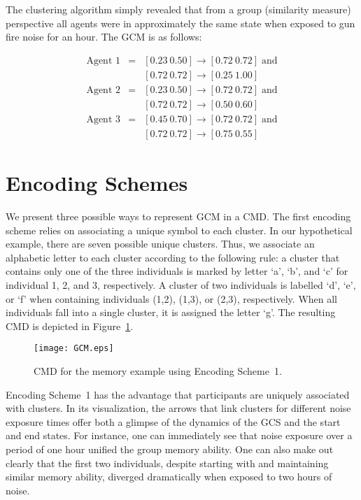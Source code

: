 \documentclass[conference]{IEEEtran}
\begin{document}
The clustering algorithm simply revealed that from a group (similarity measure) perspective all
agents were in approximately the same state when exposed to gun fire noise for an hour. The GCM is
as follows:

\begin{eqnarray*}
\mbox{Agent 1} & = & [0.23 \ 0.50] \rightarrow [0.72 \ 0.72] \; \mbox{and}\\
               &   & [0.72 \ 0.72] \rightarrow [0.25 \ 1.00]\\
\mbox{Agent 2} & = & [0.23 \ 0.50] \rightarrow [0.72 \ 0.72] \; \mbox{and}\\
               &   & [0.72 \ 0.72] \rightarrow [0.50 \ 0.60]\\
\mbox{Agent 3} & = & [0.45 \ 0.70] \rightarrow [0.72 \ 0.72] \; \mbox{and}\\
               &   & [0.72 \ 0.72] \rightarrow [0.75 \ 0.55]
\end{eqnarray*}

\section{Encoding Schemes}

We present three possible ways to represent GCM in a CMD. The first encoding scheme relies on
associating a unique symbol to each cluster. In our hypothetical example, there are seven possible
unique clusters. Thus, we associate an alphabetic letter to each cluster according to the following
rule: a cluster that contains only one of the three individuals is marked by letter `a', `b', and
`c' for individual 1, 2, and 3, respectively. A cluster of two individuals is labelled `d', `e', or
`f' when containing individuals (1,2), (1,3), or (2,3), respectively. When all individuals fall
into a single cluster, it is assigned the letter `g'. The resulting CMD is depicted in
Figure~\ref{fig:cmd1}.

\begin{figure}[!t]
\centering
\texttt{[image: GCM.eps]}
\caption{CMD for the memory example using Encoding Scheme~1.} \label{fig:cmd1}
\end{figure}

Encoding Scheme~1 has the advantage that participants are uniquely associated with clusters. In its
visualization, the arrows that link clusters for different noise exposure times offer both a
glimpse of the dynamics of the GCS and the start and end states. For instance, one can immediately
see that noise exposure over a period of one hour unified the group memory ability. One can also
make out clearly that the first two individuals, despite starting with and maintaining similar
memory ability, diverged dramatically when exposed to two hours of noise.
\end{document}
